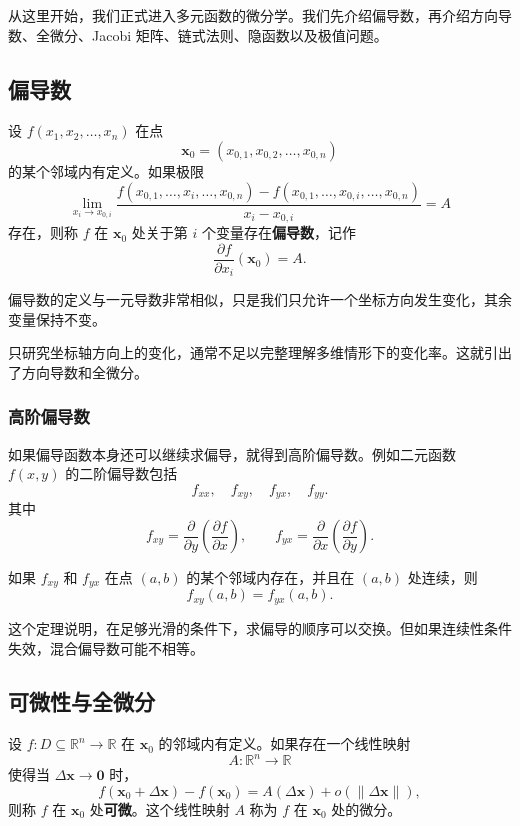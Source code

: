 从这里开始，我们正式进入多元函数的微分学。我们先介绍偏导数，再介绍方向导数、全微分、Jacobi 矩阵、链式法则、隐函数以及极值问题。

\subsection{偏导数}

\begin{definition}[偏导数]
设 $f(x_1,x_2,\dots,x_n)$ 在点
\[
    \mathbf{x}_0=(x_{0,1},x_{0,2},\dots,x_{0,n})
\]
的某个邻域内有定义。如果极限
\[
\lim_{x_i\to x_{0,i}}
\frac{f(x_{0,1},\dots,x_i,\dots,x_{0,n})-f(x_{0,1},\dots,x_{0,i},\dots,x_{0,n})}{x_i-x_{0,i}}
=A
\]
存在，则称 $f$ 在 $\mathbf{x}_0$ 处关于第 $i$ 个变量存在\textbf{偏导数}，记作
\[
    \frac{\partial f}{\partial x_i}(\mathbf{x}_0)=A.
\]
\end{definition}

偏导数的定义与一元导数非常相似，只是我们只允许一个坐标方向发生变化，其余变量保持不变。

\begin{remark}
只研究坐标轴方向上的变化，通常不足以完整理解多维情形下的变化率。这就引出了方向导数和全微分。
\end{remark}

\subsubsection{高阶偏导数}

如果偏导函数本身还可以继续求偏导，就得到高阶偏导数。例如二元函数 $f(x,y)$ 的二阶偏导数包括
\[
    f_{xx},\quad f_{xy},\quad f_{yx},\quad f_{yy}.
\]
其中
\[
    f_{xy}=\frac{\partial}{\partial y}\left(\frac{\partial f}{\partial x}\right),
    \qquad
    f_{yx}=\frac{\partial}{\partial x}\left(\frac{\partial f}{\partial y}\right).
\]

\begin{theorem}[混合偏导数相等定理]
如果 $f_{xy}$ 和 $f_{yx}$ 在点 $(a,b)$ 的某个邻域内存在，并且在 $(a,b)$ 处连续，则
\[
    f_{xy}(a,b)=f_{yx}(a,b).
\]
\end{theorem}

这个定理说明，在足够光滑的条件下，求偏导的顺序可以交换。但如果连续性条件失效，混合偏导数可能不相等。

\subsection{可微性与全微分}

\begin{definition}[可微]
设 $f:D\subseteq\mathbb{R}^n\to\mathbb{R}$ 在 $\mathbf{x}_0$ 的邻域内有定义。如果存在一个线性映射
\[
    A:\mathbb{R}^n\to\mathbb{R}
\]
使得当 $\Delta\mathbf{x}\to\mathbf{0}$ 时，
\[
    f(\mathbf{x}_0+\Delta\mathbf{x})-f(\mathbf{x}_0)
    =A(\Delta\mathbf{x})+o(\|\Delta\mathbf{x}\|),
\]
则称 $f$ 在 $\mathbf{x}_0$ 处\textbf{可微}。这个线性映射 $A$ 称为 $f$ 在 $\mathbf{x}_0$ 处的微分。
\end{definition}


